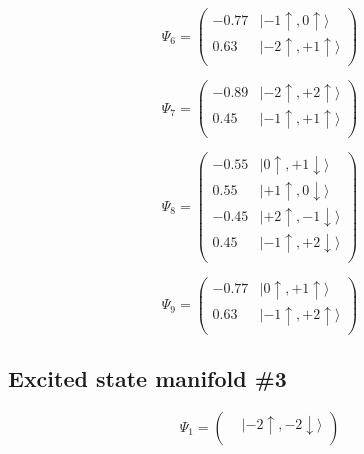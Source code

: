 \documentclass{article}
\begin{document}
\begin{equation}
\Psi_{6} = 
\begin{pmatrix}
-      0.77  &  |-1\uparrow , 0\uparrow\rangle  \\
      0.63  &  |-2\uparrow , +1\uparrow\rangle  \\
\end{pmatrix}
\end{equation}

\begin{equation}
\Psi_{7} = 
\begin{pmatrix}
-      0.89  &  |-2\uparrow , +2\uparrow\rangle  \\
      0.45  &  |-1\uparrow , +1\uparrow\rangle  \\
\end{pmatrix}
\end{equation}

\begin{equation}
\Psi_{8} = 
\begin{pmatrix}
-      0.55  &  |0\uparrow , +1\downarrow\rangle  \\
      0.55  &  |+1\uparrow , 0\downarrow\rangle  \\
-      0.45  &  |+2\uparrow , -1\downarrow\rangle  \\
      0.45  &  |-1\uparrow , +2\downarrow\rangle  \\
\end{pmatrix}
\end{equation}

\begin{equation}
\Psi_{9} = 
\begin{pmatrix}
-      0.77  &  |0\uparrow , +1\uparrow\rangle  \\
      0.63  &  |-1\uparrow , +2\uparrow\rangle  \\
\end{pmatrix}
\end{equation}



\subsection{Excited state manifold \#3}


\begin{equation}
\Psi_{1} = 
\begin{pmatrix}
  &  |-2\uparrow , -2\downarrow\rangle  \\
\end{pmatrix}
\end{equation}
\end{document}
